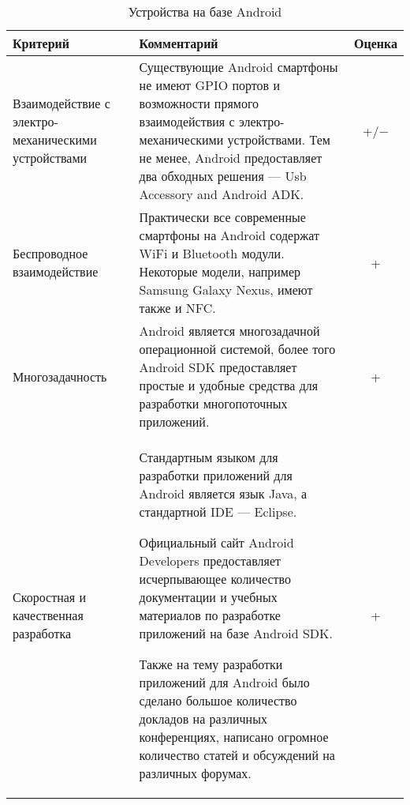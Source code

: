 \bgroup %
\def\arraystretch{1.5}%
  \begin{longtable}{| p{} | p{} | c |} 
  \caption{Устройства на базе Android} %
    \hline
      Критерий & Комментарий & Оценка \\
    \hline
      Взаимодействие с электро-механическими устройствами

      & Существующие Android смартфоны не имеют GPIO портов и возможности прямого взаимодействия с электро-механическими устройствами. Тем не менее, Android предоставляет два обходных решения — Usb Accessory and Android ADK.

      & +/$-$ \\
    \hline
      Беспроводное взаимодействие

      & Практически все современные смартфоны на Android содержат WiFi и Bluetooth модули. Некоторые модели, например Samsung Galaxy Nexus, имеют также и NFC.
      
      & + \\
    \hline
      Многозадачность

      & Android является многозадачной операционной системой, более того Android SDK предоставляет простые и удобные средства для разработки многопоточных приложений.

      & + \\
    \hline
      Скоростная и качественная разработка
      
      & Стандартным языком для разработки приложений для Android является язык Java, а стандартной IDE — Eclipse.

      Официальный сайт Android Developers предоставляет исчерпывающее количество документации и учебных материалов по разработке приложений на базе Android SDK. 

      Также на тему разработки приложений для Android было сделано большое количество докладов на различных конференциях, написано огромное количество статей и обсуждений на различных форумах.

      & + \\
    \hline
  \end{longtable}
\egroup %

\pagebreak


